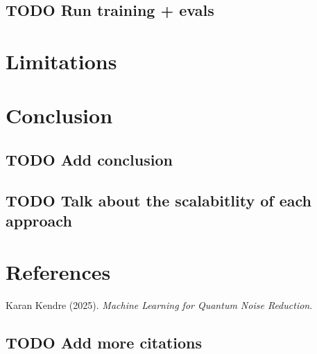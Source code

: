 \documentclass[11pt]{article}
\begin{document}
\subsection{{\bfseries\sffamily TODO} Run training + evals}
\label{sec:org1c3f175}
\section{Limitations}
\label{sec:orge7a00d8}
\section{Conclusion}
\label{sec:org53d48ed}
\subsection{{\bfseries\sffamily TODO} Add conclusion}
\label{sec:orgd197b0b}
\subsection{{\bfseries\sffamily TODO} Talk about the scalabitlity of each approach}
\label{sec:org9eae7c4}
\section{References}
\label{sec:org07e340e}
\noindent
Karan Kendre (2025). \emph{Machine Learning for Quantum Noise Reduction}.
\subsection{{\bfseries\sffamily TODO} Add more citations}
\label{sec:orgef9172e}
\end{document}
